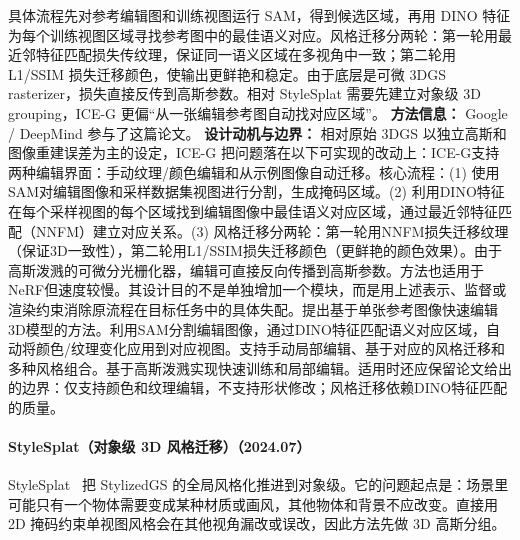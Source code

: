 具体流程先对参考编辑图和训练视图运行 SAM，得到候选区域，再用 DINO 特征为每个训练视图区域寻找参考图中的最佳语义对应。风格迁移分两轮：第一轮用最近邻特征匹配损失传纹理，保证同一语义区域在多视角中一致；第二轮用 L1/SSIM 损失迁移颜色，使输出更鲜艳和稳定。由于底层是可微 3DGS rasterizer，损失直接反传到高斯参数。相对 StyleSplat 需要先建立对象级 3D grouping，ICE-G 更偏“从一张编辑参考图自动找对应区域”。
\textbf{方法信息：} Google / DeepMind 参与了这篇论文。
\textbf{设计动机与边界：} 相对原始 3DGS 以独立高斯和图像重建误差为主的设定，ICE-G 把问题落在以下可实现的改动上：ICE-G支持两种编辑界面：手动纹理/颜色编辑和从示例图像自动迁移。核心流程：(1) 使用SAM对编辑图像和采样数据集视图进行分割，生成掩码区域。(2) 利用DINO特征在每个采样视图的每个区域找到编辑图像中最佳语义对应区域，通过最近邻特征匹配（NNFM）建立对应关系。(3) 风格迁移分两轮：第一轮用NNFM损失迁移纹理（保证3D一致性），第二轮用L1/SSIM损失迁移颜色（更鲜艳的颜色效果）。由于高斯泼溅的可微分光栅化器，编辑可直接反向传播到高斯参数。方法也适用于NeRF但速度较慢。其设计目的不是单独增加一个模块，而是用上述表示、监督或渲染约束消除原流程在目标任务中的具体失配。提出基于单张参考图像快速编辑3D模型的方法。利用SAM分割编辑图像，通过DINO特征匹配语义对应区域，自动将颜色/纹理变化应用到对应视图。支持手动局部编辑、基于对应的风格迁移和多种风格组合。基于高斯泼溅实现快速训练和局部编辑。适用时还应保留论文给出的边界：仅支持颜色和纹理编辑，不支持形状修改；风格迁移依赖DINO特征匹配的质量。
\paragraph{StyleSplat（对象级 3D 风格迁移）（2024.07）}
StyleSplat~\cite{2407_09473} 把 StylizedGS 的全局风格化推进到对象级。它的问题起点是：场景里可能只有一个物体需要变成某种材质或画风，其他物体和背景不应改变。直接用 2D 掩码约束单视图风格会在其他视角漏改或误改，因此方法先做 3D 高斯分组。

